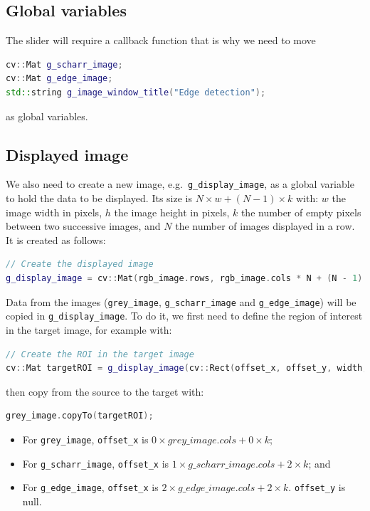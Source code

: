 \documentclass[english,a4paper,12pt,oneside]{article}
\begin{document}
\subsection{Global variables}
The slider will require a callback function that is why we need to move 
 \begin{lstlisting}[language=c++]
cv::Mat g_scharr_image;
cv::Mat g_edge_image;
std::string g_image_window_title("Edge detection");
\end{lstlisting}
as global variables. 


\subsection{Displayed image}

We also need to create a new image, e.g.~\verb+g_display_image+, as a global variable to hold the data to be displayed. 
Its size is $N \times w + (N - 1) \times k$ with:
 $w$ the image width in pixels, $h$ the image height in pixels, $k$ the number of empty pixels between two successive images, and
 $N$ the number of images displayed in a row.
It is created as follows:
 \begin{lstlisting}[language=c++]
// Create the displayed image
g_display_image = cv::Mat(rgb_image.rows, rgb_image.cols * N + (N - 1) * k, CV_32FC1, cv::Scalar(0.5, 0.5, 0.5));
\end{lstlisting}

Data from the images (\verb+grey_image+, \verb+g_scharr_image+ and \verb+g_edge_image+) will be copied in \verb+g_display_image+. 
To do it, we first need to define the region of interest in the target image, for example with:
 \begin{lstlisting}[language=c++]
// Create the ROI in the target image
cv::Mat targetROI = g_display_image(cv::Rect(offset_x, offset_y, width, height))
\end{lstlisting}
then copy from the source to the target with:
 \begin{lstlisting}[language=c++]
grey_image.copyTo(targetROI);
\end{lstlisting}
\begin{itemize}
 \item For \verb+grey_image+,     \verb+offset_x+ is $0 \times grey\_image.cols + 0 \times k$;
 \item For \verb+g_scharr_image+, \verb+offset_x+ is $1 \times g\_scharr\_image.cols + 2 \times k$; and
 \item For \verb+g_edge_image+,   \verb+offset_x+ is $2 \times g\_edge\_image.cols + 2 \times k$. 
\verb+offset_y+ is null.
\end{itemize}
\end{document}
